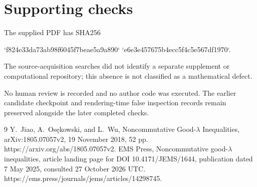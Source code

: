 \documentclass[10pt]{article}
\begin{document}
\section*{Supporting checks}
The supplied PDF has SHA256\par
`f824e33da73ab98f6045f7beae5a9a890`
`e6e3e457675b4ecc5f4c5e567df1970`.\par
The source-acquisition searches did not identify a separate supplement or computational repository; this absence is not classified as a mathematical defect.\par
No human review is recorded and no author code was executed. The earlier candidate checkpoint and rendering-time false inspection records remain preserved alongside the later completed checks.\par
9 Y. Jiao, A. Osękowski, and L. Wu, Noncommutative Good-\(\lambda\) Inequalities, arXiv:1805.07057v2, 19 November 2018, 52 pp. https://arxiv.org/abs/1805.07057v2. EMS Press, Noncommutative good-\(\lambda\) inequalities, article landing page for DOI 10.4171/JEMS/1644, publication dated 7 May 2025, consulted 27 October 2026 UTC. https://ems.press/journals/jems/articles/14298745.\par
\end{document}
